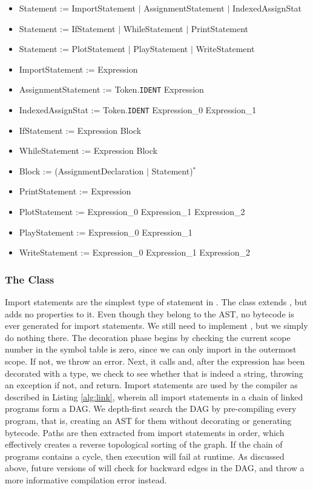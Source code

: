 \begin{itemize}
	\item Statement := ImportStatement $|$ AssignmentStatement $|$ IndexedAssignStat
	\item Statement := IfStatement $|$ WhileStatement $|$ PrintStatement
	\item Statement := PlotStatement $|$ PlayStatement $|$ WriteStatement
	\item ImportStatement := Expression
	\item AssignmentStatement := Token.\texttt{IDENT} Expression
	\item IndexedAssignStat := Token.\texttt{IDENT} Expression\_0 Expression\_1
	\item IfStatement := Expression Block
	\item WhileStatement := Expression Block
	\item Block := (AssignmentDeclaration $|$ Statement)$^*$
	\item PrintStatement := Expression
	\item PlotStatement := Expression\_0 Expression\_1 Expression\_2
	\item PlayStatement := Expression\_0 Expression\_1
	\item WriteStatement := Expression\_0 Expression\_1 Expression\_2
\end{itemize}

\subsubsection{The  Class}

Import statements are the simplest type of statement in . The  class extends , but adds no properties to it. Even though they belong to the AST, no bytecode is ever generated for import statements. We still need to implement , but we simply do nothing there. The decoration phase begins by checking the current scope number in the symbol table is zero, since we can only import in the outermost scope. If not, we throw an error. Next, it calls  and, after the expression has been decorated with a type, we check to see whether that is indeed a string, throwing an exception if not, and return. Import statements are used by the compiler as described in Listing \ref{alg:link}, wherein all import statements in a chain of linked programs form a DAG. We depth-first search the DAG by pre-compiling every program, that is, creating an AST for them without decorating or generating bytecode. Paths are then extracted from import statements in order, which effectively creates a reverse topological sorting of the graph. If the chain of programs contains a cycle, then execution will fail at runtime. As discussed above, future versions of  will check for backward edges in the DAG, and throw a more informative compilation error instead.

